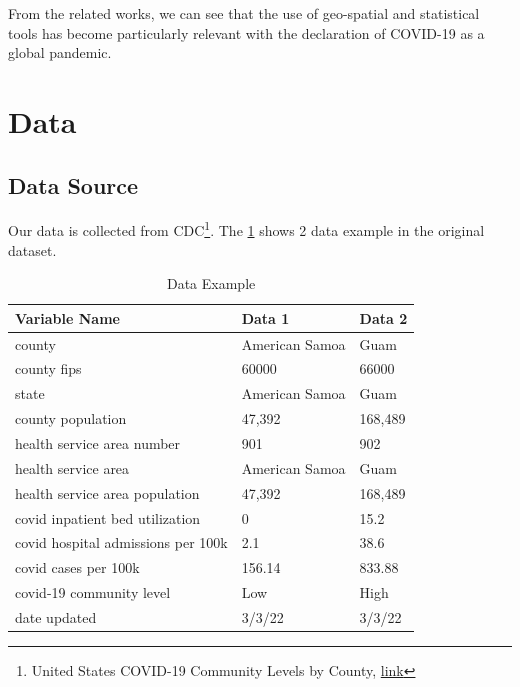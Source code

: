 \documentclass{article}
\begin{document}
From the related works, we can see that the use of geo-spatial and statistical tools has become particularly relevant with the declaration of COVID-19 as a global pandemic.

\section{Data}
\subsection{Data Source}
Our data is collected from CDC\footnote{United States COVID-19 Community Levels by County, \href{https://data.cdc.gov/Public-Health-Surveillance/United-States-COVID-19-Community-Levels-by-County/3nnm-4jnil}{link}}\cite{cdcp}. The \cref{Data Example} shows 2 data example in the original dataset.
\begin{table}[!ht]
    \centering
    \begin{tabular}{lll}
        \hline
        Variable Name                      & Data 1         & Data 2  \\
        \hline
        county                             & American Samoa & Guam    \\
        county fips                        & 60000          & 66000   \\
        state                              & American Samoa & Guam    \\
        county population                  & 47,392         & 168,489 \\
        health service area number         & 901            & 902     \\
        health service area                & American Samoa & Guam    \\
        health service area population     & 47,392         & 168,489 \\
        covid inpatient bed utilization    & 0              & 15.2    \\
        covid hospital admissions per 100k & 2.1            & 38.6    \\
        covid cases per 100k               & 156.14         & 833.88  \\
        covid-19 community level           & Low            & High    \\
        date updated                       & 3/3/22         & 3/3/22  \\
        \hline
    \end{tabular}
    \caption{Data Example}
    \label{Data Example}
\end{table}
\end{document}
